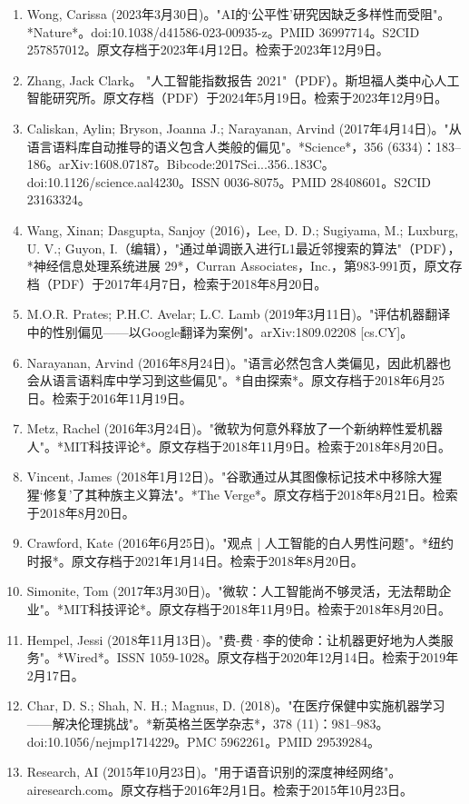 \begin{enumerate}
\item Wong, Carissa (2023年3月30日)。"AI的‘公平性’研究因缺乏多样性而受阻"。*Nature*。doi:10.1038/d41586-023-00935-z。PMID 36997714。S2CID 257857012。原文存档于2023年4月12日。检索于2023年12月9日。
\item Zhang, Jack Clark。 "人工智能指数报告 2021"（PDF）。斯坦福人类中心人工智能研究所。原文存档（PDF）于2024年5月19日。检索于2023年12月9日。
\item Caliskan, Aylin; Bryson, Joanna J.; Narayanan, Arvind (2017年4月14日)。"从语言语料库自动推导的语义包含人类般的偏见"。*Science*，356 (6334)：183–186。arXiv:1608.07187。Bibcode:2017Sci...356..183C。doi:10.1126/science.aal4230。ISSN 0036-8075。PMID 28408601。S2CID 23163324。
\item Wang, Xinan; Dasgupta, Sanjoy (2016)，Lee, D. D.; Sugiyama, M.; Luxburg, U. V.; Guyon, I.（编辑），"通过单调嵌入进行L1最近邻搜索的算法"（PDF），*神经信息处理系统进展 29*，Curran Associates，Inc.，第983-991页，原文存档（PDF）于2017年4月7日，检索于2018年8月20日。
\item M.O.R. Prates; P.H.C. Avelar; L.C. Lamb (2019年3月11日)。"评估机器翻译中的性别偏见——以Google翻译为案例"。arXiv:1809.02208 [cs.CY]。
\item Narayanan, Arvind (2016年8月24日)。"语言必然包含人类偏见，因此机器也会从语言语料库中学习到这些偏见"。*自由探索*。原文存档于2018年6月25日。检索于2016年11月19日。
\item Metz, Rachel (2016年3月24日)。"微软为何意外释放了一个新纳粹性爱机器人"。*MIT科技评论*。原文存档于2018年11月9日。检索于2018年8月20日。
\item Vincent, James (2018年1月12日)。"谷歌通过从其图像标记技术中移除大猩猩‘修复’了其种族主义算法"。*The Verge*。原文存档于2018年8月21日。检索于2018年8月20日。
\item Crawford, Kate (2016年6月25日)。"观点 | 人工智能的白人男性问题"。*纽约时报*。原文存档于2021年1月14日。检索于2018年8月20日。
\item Simonite, Tom (2017年3月30日)。"微软：人工智能尚不够灵活，无法帮助企业"。*MIT科技评论*。原文存档于2018年11月9日。检索于2018年8月20日。
\item Hempel, Jessi (2018年11月13日)。"费-费·李的使命：让机器更好地为人类服务"。*Wired*。ISSN 1059-1028。原文存档于2020年12月14日。检索于2019年2月17日。
\item Char, D. S.; Shah, N. H.; Magnus, D. (2018)。"在医疗保健中实施机器学习——解决伦理挑战"。*新英格兰医学杂志*，378 (11)：981–983。doi:10.1056/nejmp1714229。PMC 5962261。PMID 29539284。
\item Research, AI (2015年10月23日)。"用于语音识别的深度神经网络"。airesearch.com。原文存档于2016年2月1日。检索于2015年10月23日。

\end{enumerate}
